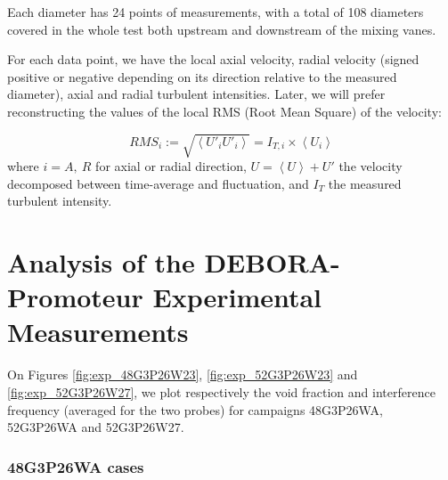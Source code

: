 \npar



Each diameter has 24 points of measurements, with a total of 108 diameters covered in the whole test both upstream and downstream of the mixing vanes. 

\npar

For each data point, we have the local axial velocity, radial velocity (signed positive or negative depending on its direction relative to the measured diameter), axial and radial turbulent intensities. Later, we will prefer reconstructing the values of the local RMS (Root Mean Square) of the velocity:

\begin{equation}
RMS_{i} := \sqrt{\left<U'_{i}U'_{i}\right>} = I_{T,i} \times \left<U_{i}\right>
\label{eq:RMS_def}
\end{equation}
where $i=A,\ R$ for axial or radial direction, $U=\left<U\right> + U'$ the velocity decomposed between time-average and fluctuation, and $I_{T}$ the measured turbulent intensity. 




\section{Analysis of the DEBORA-Promoteur Experimental Measurements}
\label{sec:deb_prom_anal}

On Figures \ref{fig:exp_48G3P26W23}, \ref{fig:exp_52G3P26W23} and \ref{fig:exp_52G3P26W27}, we plot respectively the void fraction and interference frequency (averaged for the two probes) for campaigns 48G3P26WA, 52G3P26WA and 52G3P26W27.



\subsubsection{48G3P26WA cases}


